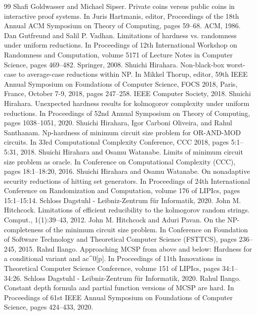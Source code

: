 \documentclass[10pt,a4paper]{article}
\begin{document}
\begin{thebibliography}{99}
 Shafi Goldwasser and Michael Sipser. Private coins versus public coins in interactive proof systems. In Juris Hartmanis, editor, Proceedings of the 18th Annual ACM Symposium on Theory of Computing, pages 59–68. ACM, 1986.
 Dan Gutfreund and Salil P. Vadhan. Limitations of hardness vs. randomness under uniform reductions. In Proceedings of 12th International Workshop on Randomness and Computation, volume 5171 of Lecture Notes in Computer Science, pages 469–482. Springer, 2008.
 Shuichi Hirahara. Non-black-box worst-case to average-case reductions within NP. In Mikkel Thorup, editor, 59th IEEE Annual Symposium on Foundations of Computer Science, FOCS 2018, Paris, France, October 7-9, 2018, pages 247–258. IEEE Computer Society, 2018.
 Shuichi Hirahara. Unexpected hardness results for kolmogorov complexity under uniform reductions. In Proceedings of 52nd Annual Symposium on Theory of Computing, pages 1038–1051, 2020.
 Shuichi Hirahara, Igor Carboni Oliveira, and Rahul Santhanam. Np-hardness of minimum circuit size problem for OR-AND-MOD circuits. In 33rd Computational Complexity Conference, CCC 2018, pages 5:1–5:31, 2018.
 Shuichi Hirahara and Osamu Watanabe. Limits of minimum circuit size problem as oracle. In Conference on Computational Complexity (CCC), pages 18:1–18:20, 2016.
 Shuichi Hirahara and Osamu Watanabe. On nonadaptive security reductions of hitting set generators. In Proceedings of 24th International Conference on Randomization and Computation, volume 176 of LIPIcs, pages 15:1–15:14. Schloss Dagstuhl - Leibniz-Zentrum für Informatik, 2020.
 John M. Hitchcock. Limitations of efficient reducibility to the kolmogorov random strings. Comput., 1(1):39–43, 2012.
 John M. Hitchcock and Aduri Pavan. On the NP-completeness of the minimum circuit size problem. In Conference on Foundation of Software Technology and Theoretical Computer Science (FSTTCS), pages 236–245, 2015.
 Rahul Ilango. Approaching MCSP from above and below: Hardness for a conditional variant and ac\textasciicircum{}0[p]. In Proceedings of 11th Innovations in Theoretical Computer Science Conference, volume 151 of LIPIcs, pages 34:1–34:26. Schloss Dagstuhl - Leibniz-Zentrum für Informatik, 2020.
 Rahul Ilango. Constant depth formula and partial function versions of MCSP are hard. In Proceedings of 61st IEEE Annual Symposium on Foundations of Computer Science, pages 424–433, 2020.

\end{thebibliography}
\end{document}
